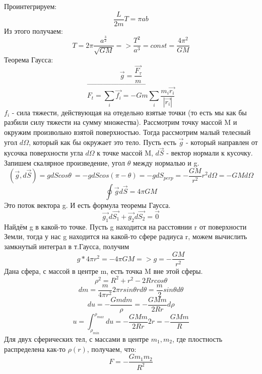 Проинтегрируем:
\[\frac{L}{2m}T = \pi ab\]
Из этого получаем:
\[T = 2\pi \frac{a^{\frac{3}{2}}}{\sqrt{GM}} => \frac{T^2}{a^3} = const = \frac{4\pi^2}{GM}\]
Теорема Гаусса:
\[\Vec{g} = \frac{\Vec{F_{\tau}}}{m}\]
\[\Vec{F_t = \sum_i \Vec{f_i} = - Gm \sum_i \frac{m_i\Vec{r_i}}{|\Vec{r_i}|}}\]
$f_i$ - сила тяжести, действующая на отедельно взятые точки (то есть мы как бы разбили силу тяжести на сумму множества).
Рассмотрим точку массой M и окружим произвольно взятой поверхностью.
Тогда рассмотрим малый телесный угол $d\Omega$, который как бы окружает это тело.
Пусть есть $\Vec{g}$ - который направлен от кусочка поверхности угла $d\Omega$ к точке массой M, $d\Vec{S}$ - вектор нормали к кусочку.
Запишем скалярное произведение, угол $\theta$ между нормалью и g.
\[(\Vec{g}, d\Vec{S}) = gdScos\theta\ = -gdScos(\pi - \theta)= -gdS_{perp} = - \frac{GM}{r^2}r^2d\Omega = -GMd\Omega\]
\[\oint \Vec{g}d\Vec{S} = 4\pi GM\]
Это поток вектора g. И есть формула теоремы Гаусса.
\[\Vec{g_1}d\Vec{S_1} + \Vec{g_2}d\Vec{S_2} = \Vec{0}\]
Найдём g в какой-то точке. Пусть g находится на расстоянии r от поверхности Земли, тогда у нас g находится на какой-то сфере радиуса r, можем вычислить замкнутый интеграл в т.Гаусса, получим
\[g * 4\pi r^2 = -4\pi GM => g = -\frac{GM}{r^2}\]
Дана сфера, с массой в центре m, есть точка M вне этой сферы.
\[\rho^2 = R^2 + r^2 - 2Rrcos\theta\]
\[dm = \frac{m}{4\pi r^2}2\pi r sin\theta rd\theta = \frac{m}{2}sin\theta d\theta\]
\[du = - \frac{Gmdm}{\rho} = - \frac{GMm}{2Rr}d\rho\]
\[u = \int_{\rho_{min}}^{\rho_{max}}du = -\frac{GMm}{2Rr}2r = - \frac{GMm}{R}\]
Для двух сферических тел, с массами в центре $m_1, m_2$, где плостность распределена как-то $\rho(r)$, получаем, что:
\[F = -\frac{Gm_1m_2}{R^2}\]